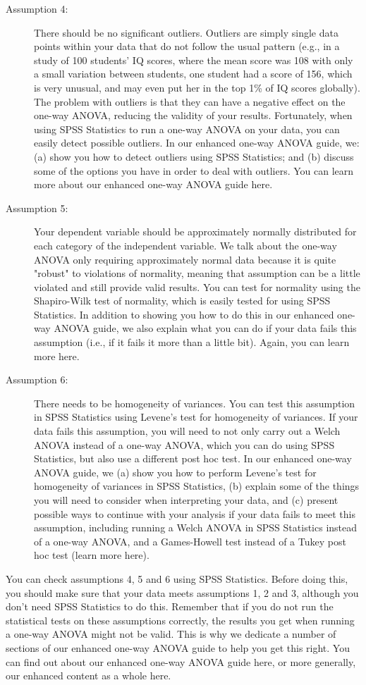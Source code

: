 \documentclass[]{article}
\begin{document}
\begin{description}
\item[Assumption 4:] There should be no significant outliers. Outliers are simply single data points within your data that do not follow the usual pattern (e.g., in a study of 100 students' IQ scores, where the mean score was 108 with only a small variation between students, one student had a score of 156, which is very unusual, and may even put her in the top 1\% of IQ scores globally). The problem with outliers is that they can have a negative effect on the one-way ANOVA, reducing the validity of your results. Fortunately, when using SPSS Statistics to run a one-way ANOVA on your data, you can easily detect possible outliers. In our enhanced one-way ANOVA guide, we: (a) show you how to detect outliers using SPSS Statistics; and (b) discuss some of the options you have in order to deal with outliers. You can learn more about our enhanced one-way ANOVA guide here.
\item[Assumption 5:] Your dependent variable should be approximately normally distributed for each category of the independent variable. We talk about the one-way ANOVA only requiring approximately normal data because it is quite "robust" to violations of normality, meaning that assumption can be a little violated and still provide valid results. You can test for normality using the Shapiro-Wilk test of normality, which is easily tested for using SPSS Statistics. In addition to showing you how to do this in our enhanced one-way ANOVA guide, we also explain what you can do if your data fails this assumption (i.e., if it fails it more than a little bit). Again, you can learn more here.
\item[Assumption 6:] There needs to be homogeneity of variances. You can test this assumption in SPSS Statistics using Levene's test for homogeneity of variances. If your data fails this assumption, you will need to not only carry out a Welch ANOVA instead of a one-way ANOVA, which you can do using SPSS Statistics, but also use a different post hoc test. In our enhanced one-way ANOVA guide, we (a) show you how to perform Levene’s test for homogeneity of variances in SPSS Statistics, (b) explain some of the things you will need to consider when interpreting your data, and (c) present possible ways to continue with your analysis if your data fails to meet this assumption, including running a Welch ANOVA in SPSS Statistics instead of a one-way ANOVA, and a Games-Howell test instead of a Tukey post hoc test (learn more here).
\end{description}
You can check assumptions 4, 5 and 6 using SPSS Statistics. Before doing this, you should make sure that your data meets assumptions 1, 2 and 3, although you don't need SPSS Statistics to do this. Remember that if you do not run the statistical tests on these assumptions correctly, the results you get when running a one-way ANOVA might not be valid. This is why we dedicate a number of sections of our enhanced one-way ANOVA guide to help you get this right. You can find out about our enhanced one-way ANOVA guide here, or more generally, our enhanced content as a whole here.
\end{document}
